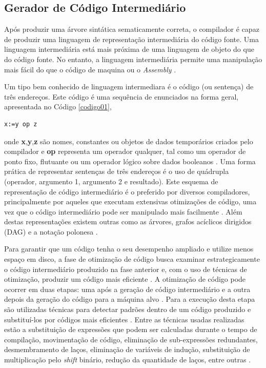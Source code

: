 \subsection{Gerador de Código Intermediário}

Após produzir uma árvore sintática sematicamente correta, o compilador é capaz de
 produzir uma linguagem de representação intermediária do código fonte. Uma linguagem 
intermediária está mais próxima de uma linguagem de objeto do que do código fonte. 
No entanto, a linguagem  intermediária permite uma manipulação mais fácil do que o 
código de maquina ou o \textit{Assembly} \cite{ref25}. 

Um tipo bem conhecido de linguagem intermediara é o código (ou sentença) de três 
endereços\cite{ref26}. Este código é uma sequência de enunciados na forma geral, apresentada 
 no Código \ref{codigo01},

\begin{lstlisting}[language=Pascal,frame=single,title={Código 1: Codigo de três endereços},label=codigo01]
   x:=y op z
\end{lstlisting}

onde \textbf{x},\textbf{y},\textbf{z} são nomes, constantes ou objetos de dados 
temporários criados pelo compilador e \textbf{op} representa um operador qualquer,
 tal como um operador de ponto fixo, flutuante ou um operador lógico sobre dados
 booleanos \cite{ref27}. Uma forma prática de representar sentenças de três endereços é o uso
 de quádrupla (operador, argumento 1, argumento 2 e resultado). 
Este esquema de representação de código intermediário é o preferido por diversos
 compiladores, principalmente por aqueles que executam extensivas otimizações de
 código, uma vez que o código intermediário pode ser manipulado mais 
facilmente \cite{ref28}. Além destas representações existem outras como as 
árvores, grafos acíclicos dirigidos (DAG) e a notação polonesa \cite{ref29}.

Para garantir que um código tenha o seu desempenho ampliado e utilize menos 
espaço em disco, a fase de otimização de código busca examinar 
estrategicamente o código intermediário produzido na fase anterior e, com o 
uso de técnicas de otimização, produzir um código mais eficiente \cite{ref30}
. A otimização de código pode ocorrer em duas etapas: uma após a geração de 
código intermediário e a outra depois da geração do código para a máquina 
alvo \cite{ref31}. 
Para a execução desta etapa são utilizadas técnicas para detectar 
padrões dentro de um código produzido e substituí-los por códigos mais
 eficientes \cite{ref28}. Entre as técnicas usadas realizadas estão a 
substituição de expressões que podem ser calculadas durante o tempo 
de compilação, movimentação de código, eliminação de sub-expressões 
redundantes, desmembramento de laços, eliminação de variáveis de indução, 
substituição de multiplicação pelo \textit{shift} binário, redução da 
quantidade de laços, entre outras \cite{ref30}.

